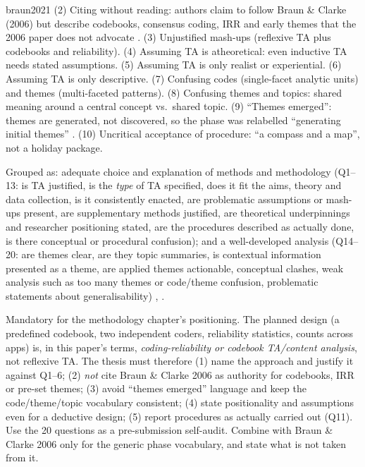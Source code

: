 \begin{papercard}{braun2021}
 (2) Citing without reading: authors claim to follow Braun \& Clarke (2006) but describe codebooks, consensus coding, IRR and early themes that the 2006 paper does not advocate . (3) Unjustified mash-ups (reflexive TA plus codebooks and reliability). (4) Assuming TA is atheoretical: even inductive TA needs stated assumptions. (5) Assuming TA is only realist or experiential. (6) Assuming TA is only descriptive. (7) Confusing codes (single-facet analytic units) and themes (multi-faceted patterns). (8) Confusing themes and topics: shared meaning around a central concept vs.\ shared topic. (9) ``Themes emerged'': themes are generated, not discovered, so the phase was relabelled ``generating initial themes'' . (10) Uncritical acceptance of procedure: ``a compass and a map'', not a holiday package.

 Grouped as: adequate choice and explanation of methods and methodology (Q1--13: is TA justified, is the \emph{type} of TA specified, does it fit the aims, theory and data collection, is it consistently enacted, are problematic assumptions or mash-ups present, are supplementary methods justified, are theoretical underpinnings and researcher positioning stated, are the procedures described as actually done, is there conceptual or procedural confusion); and a well-developed analysis (Q14--20: are themes clear, are they topic summaries, is contextual information presented as a theme, are applied themes actionable, conceptual clashes, weak analysis such as too many themes or code/theme confusion, problematic statements about generalisability) , .

 Mandatory for the methodology chapter's positioning. The planned design (a predefined codebook, two independent coders, reliability statistics, counts across apps) is, in this paper's terms, \emph{coding-reliability or codebook TA/content analysis}, not reflexive TA. The thesis must therefore (1) name the approach and justify it against Q1--6; (2) \emph{not} cite Braun \& Clarke 2006 as authority for codebooks, IRR or pre-set themes; (3) avoid ``themes emerged'' language and keep the code/theme/topic vocabulary consistent; (4) state positionality and assumptions even for a deductive design; (5) report procedures as actually carried out (Q11). Use the 20 questions as a pre-submission self-audit. Combine with Braun \& Clarke 2006 only for the generic phase vocabulary, and state what is not taken from it.
\end{papercard}
